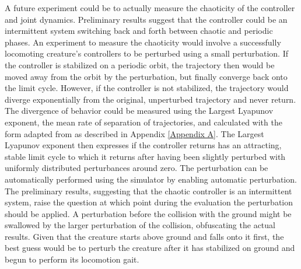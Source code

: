 \documentclass[main]{subfiles}
\begin{document}
A future experiment could be to actually measure the chaoticity of the controller and joint dynamics. %
%
Preliminary results suggest that the controller could be an intermittent system switching back and forth between chaotic and periodic phases. %
%
An experiment to measure the chaoticity would involve a successfully locomoting creature's controllers to be perturbed using a small perturbation. %
%
If the controller is stabilized on a periodic orbit, the trajectory then would be moved away from the orbit by the perturbation, but finally converge back onto the limit cycle. %
%
However, if the controller is not stabilized, the trajectory would diverge exponentially from the original, unperturbed trajectory and never return. %
%
The divergence of behavior could be measured using the Largest Lyapunov exponent, the mean rate of separation of trajectories, and calculated with the form adapted from \cite{bib:Rosenstein1993} as described in Appendix \ref{Appendix A}.%
%
The Largest Lyapunov exponent then expresses if the controller returns has an attracting, stable limit cycle to which it returns after having been slightly perturbed with uniformly distributed perturbances around zero.%
%
The perturbation can be automatically performed using the simulator by enabling automatic perturbation. %
%
The preliminary results, suggesting that the chaotic controller is an intermittent system, raise the question at which point during the evaluation the perturbation should be applied. %
%
A perturbation before the collision with the ground might be swallowed by the larger perturbation of the collision, obfuscating the actual results. %
%
Given that the creature starts above ground and falls onto it first, the best guess would be to perturb the creature after it has stabilized on ground and begun to perform its locomotion gait. 
\end{document}
